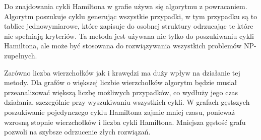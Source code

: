 \documentclass[polish,polish,a4paper]{article}
\begin{document}
\begin{spacing}{1.25}
Do znajdowania cykli Hamiltona w grafie używa się algorytmu z powracaniem. Algorytm poszukuje cyklu generując wszystkie przypadki, w tym przypadku są to tablice jednowymiarowe, które zapisuje do osobnej struktury odrzucając te które nie spełniają kryteriów. Ta metoda jest używana nie tylko do poszukiwaniu cykli Hamiltona, ale może być stosowana do rozwiązywania wszystkich problemów NP-zupełnych.

Zarówno liczba wierzchołków jak i krawędzi ma duży wpływ na działanie tej metody.
Dla grafów o większej liczbie wierzchołków algorytm będzie musiał przeanalizować większą liczbę możliwych przypadków, co wydłuży jego czas działania, szczególnie przy wyszukiwaniu wszystkich cykli. W grafach gęstszych poszukiwanie pojedynczego cyklu Hamiltona zajmie mniej czasu, ponieważ wzrosną stopnie wierzchołków i liczba cykli Hamiltona. Mniejsza gęstość grafu pozwoli na szybsze odrzucenie złych rozwiązań.
\end{spacing}
	\newpage
	\tableofcontents
\end{document}
